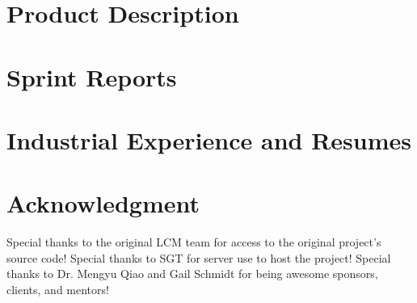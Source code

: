 \documentclass{book}
\begin{document}
\appendix

 



\chapter{Product Description}



\chapter{Sprint Reports}


\chapter{Industrial Experience and Resumes}


\chapter{Acknowledgment}
\label{SpecialThanks}  
Special thanks to the original LCM team for access to the original project's source code! Special thanks to SGT for server use to host the project! Special thanks to Dr. Mengyu Qiao and Gail Schmidt for being awesome sponsors, clients, and mentors!


\backmatter
\end{document}
